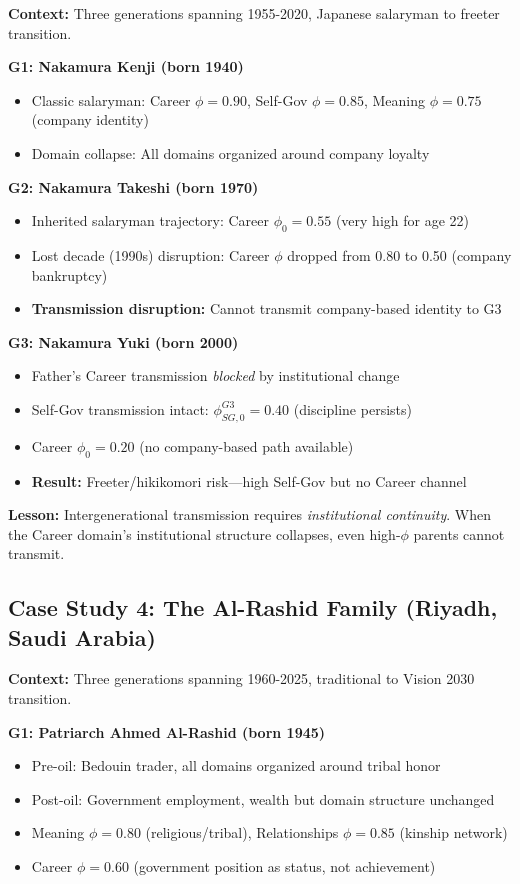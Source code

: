 \textbf{Context:} Three generations spanning 1955-2020, Japanese salaryman to freeter transition.

\textbf{G1: Nakamura Kenji (born 1940)}
\begin{itemize}[nosep]
\item Classic salaryman: Career $\phi = 0.90$, Self-Gov $\phi = 0.85$, Meaning $\phi = 0.75$ (company identity)
\item Domain collapse: All domains organized around company loyalty
\end{itemize}

\textbf{G2: Nakamura Takeshi (born 1970)}
\begin{itemize}[nosep]
\item Inherited salaryman trajectory: Career $\phi_0 = 0.55$ (very high for age 22)
\item Lost decade (1990s) disruption: Career $\phi$ dropped from 0.80 to 0.50 (company bankruptcy)
\item \textbf{Transmission disruption:} Cannot transmit company-based identity to G3
\end{itemize}

\textbf{G3: Nakamura Yuki (born 2000)}
\begin{itemize}[nosep]
\item Father's Career transmission \textit{blocked} by institutional change
\item Self-Gov transmission intact: $\phi^{G3}_{SG,0} = 0.40$ (discipline persists)
\item Career $\phi_0 = 0.20$ (no company-based path available)
\item \textbf{Result:} Freeter/hikikomori risk---high Self-Gov but no Career channel
\end{itemize}

\textbf{Lesson:} Intergenerational transmission requires \textit{institutional continuity}. When
the Career domain's institutional structure collapses, even high-$\phi$ parents cannot transmit.

\subsection{Case Study 4: The Al-Rashid Family (Riyadh, Saudi Arabia)}

\textbf{Context:} Three generations spanning 1960-2025, traditional to Vision 2030 transition.

\textbf{G1: Patriarch Ahmed Al-Rashid (born 1945)}
\begin{itemize}[nosep]
\item Pre-oil: Bedouin trader, all domains organized around tribal honor
\item Post-oil: Government employment, wealth but domain structure unchanged
\item Meaning $\phi = 0.80$ (religious/tribal), Relationships $\phi = 0.85$ (kinship network)
\item Career $\phi = 0.60$ (government position as status, not achievement)
\end{itemize}

